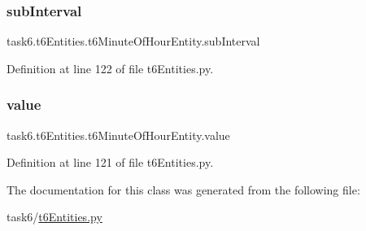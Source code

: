 \subsubsection{\texorpdfstring{sub\+Interval}{subInterval}}
{\footnotesize\ttfamily task6.\+t6\+Entities.\+t6\+Minute\+Of\+Hour\+Entity.\+sub\+Interval}



Definition at line 122 of file t6\+Entities.\+py.

\mbox{\label{classtask6_1_1t6Entities_1_1t6MinuteOfHourEntity_a05c8f877ba7e2a14268822f4b5d44b8e}} 
\subsubsection{\texorpdfstring{value}{value}}
{\footnotesize\ttfamily task6.\+t6\+Entities.\+t6\+Minute\+Of\+Hour\+Entity.\+value}



Definition at line 121 of file t6\+Entities.\+py.



The documentation for this class was generated from the following file\+:\begin{DoxyCompactItemize}
\item 
task6/\hyperlink{t6Entities_8py}{t6\+Entities.\+py}\end{DoxyCompactItemize}
